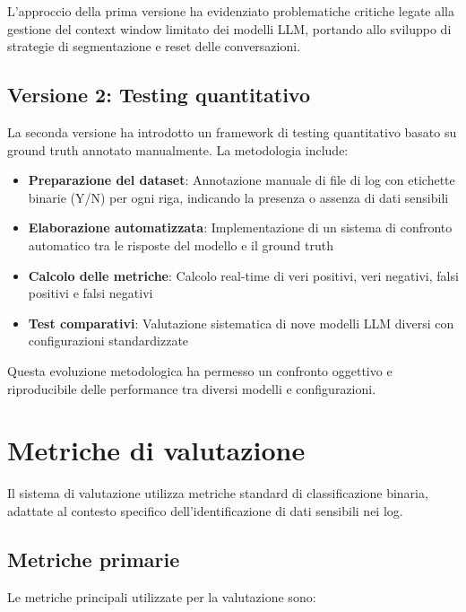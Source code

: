 \documentclass[12pt]{report}
\begin{document}
L'approccio della prima versione ha evidenziato problematiche critiche legate alla gestione del context window limitato dei modelli LLM, portando allo sviluppo di strategie di segmentazione e reset delle conversazioni.

\subsection{Versione 2: Testing quantitativo}
\label{subsec:metodologia_v2}

La seconda versione ha introdotto un framework di testing quantitativo basato su ground truth annotato manualmente. La metodologia include:

\begin{itemize}
    \item \textbf{Preparazione del dataset}: Annotazione manuale di file di log con etichette binarie (Y/N) per ogni riga, indicando la presenza o assenza di dati sensibili
    \item \textbf{Elaborazione automatizzata}: Implementazione di un sistema di confronto automatico tra le risposte del modello e il ground truth
    \item \textbf{Calcolo delle metriche}: Calcolo real-time di veri positivi, veri negativi, falsi positivi e falsi negativi
    \item \textbf{Test comparativi}: Valutazione sistematica di nove modelli LLM diversi con configurazioni standardizzate
\end{itemize}

Questa evoluzione metodologica ha permesso un confronto oggettivo e riproducibile delle performance tra diversi modelli e configurazioni.

\section{Metriche di valutazione}
\label{sec:metriche_test}

Il sistema di valutazione utilizza metriche standard di classificazione binaria, adattate al contesto specifico dell'identificazione di dati sensibili nei log.

\subsection{Metriche primarie}
\label{subsec:metriche_primarie}

Le metriche principali utilizzate per la valutazione sono:
\end{document}
